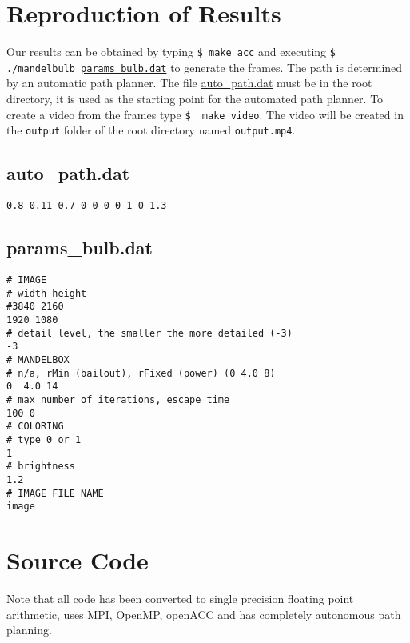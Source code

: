\documentclass[]{article}
\begin{document}
\section{Reproduction of Results}
Our results can be obtained by typing \texttt{\$ make acc} and executing \texttt{\$ ./mandelbulb \hyperref[subsec:params_bulb]{params\_bulb.dat}} to generate the frames. The path is determined by an automatic path planner. The file \hyperref[subsec:auto_path]{auto\_path.dat} must be in the root directory, it is used as the starting point for the automated path planner. To create a video from the frames type \texttt{\$~ make video}. The video will be created in the \texttt{output} folder of the root directory named \texttt{output.mp4}.

\subsection{auto\_path.dat}\label{subsec:auto_path}
\begin{Verbatim}[fontsize= \footnotesize, tabsize=4]
0.8 0.11 0.7 0 0 0 0 1 0 1.3
\end{Verbatim}

\subsection{params\_bulb.dat}\label{subsec:params_bulb}
\begin{Verbatim}[fontsize= \footnotesize, tabsize=4]
# IMAGE
# width height
#3840 2160
1920 1080
# detail level, the smaller the more detailed (-3)
-3
# MANDELBOX
# n/a, rMin (bailout), rFixed (power) (0 4.0 8)
0  4.0 14
# max number of iterations, escape time
100 0
# COLORING
# type 0 or 1
1
# brightness
1.2
# IMAGE FILE NAME
image
\end{Verbatim}

\section{Source Code}
Note that all code has been converted to single precision floating point arithmetic, uses MPI,  OpenMP, openACC and has completely autonomous path planning.
\end{document}
